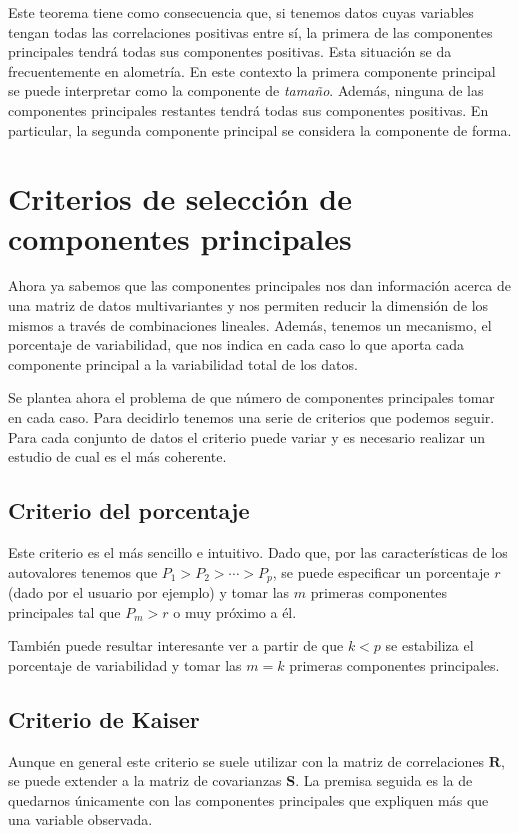 \documentclass[tfg,cienciasbased,lot,lof,covers,final,overleaf,nocopyright]{tfgtfmthesisuam}
\begin{document}
Este teorema tiene como consecuencia que, si tenemos datos cuyas variables tengan todas las correlaciones positivas entre sí, la primera de las componentes principales tendrá todas sus componentes positivas. Esta situación se da frecuentemente en alometría. En este contexto la primera componente principal se puede interpretar como la componente de \textit{tamaño}. Además, ninguna de las componentes principales restantes tendrá todas sus componentes positivas. En particular, la segunda componente principal se considera la componente de forma.

\section{Criterios de selección de componentes principales}
\label{sec:CP:Criterios}
Ahora ya sabemos que las componentes principales nos dan información acerca de una matriz de datos multivariantes y nos permiten reducir la dimensión de los mismos a través de combinaciones lineales. Además, tenemos un mecanismo, el porcentaje de variabilidad, que nos indica en cada caso lo que aporta cada componente principal a la variabilidad total de los datos.

Se plantea ahora el problema de que número de componentes principales tomar en cada caso. Para decidirlo tenemos una serie de criterios que podemos seguir. Para cada conjunto de datos el criterio puede variar y es necesario realizar un estudio de cual es el más coherente.

\subsection{Criterio del porcentaje}
Este criterio es el más sencillo e intuitivo. Dado que, por las características de los autovalores tenemos que $P_1 > P_2 > \cdots > P_p$, se puede especificar un porcentaje $r$ (dado por el usuario por ejemplo) y tomar las $m$ primeras componentes principales tal que $P_m > r$ o muy próximo a él.

También puede resultar interesante ver a partir de que $k < p$ se estabiliza el porcentaje de variabilidad y tomar las $m = k$ primeras componentes principales.

\subsection{Criterio de Kaiser}

Aunque en general este criterio se suele utilizar con la matriz de correlaciones $\mathbf{R}$, se puede extender a la matriz de covarianzas $\mathbf{S}$. La premisa seguida es la de quedarnos únicamente con las componentes principales que expliquen más que una variable observada. 
\end{document}
